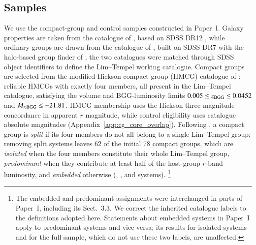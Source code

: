\documentclass{aa}
\begin{document}
\subsection{Samples}\label{sec:samples}
We use the compact-group and control samples constructed in Paper~I. Galaxy properties are taken from the catalogue of \citet{Tempel+17}, based on SDSS DR12 \citep{York+00,Alam+15}, while ordinary groups are drawn from the catalogue of \citet{Lim+17}, built on SDSS DR7 \citep{Abazajian+09} with the halo-based group finder of \citet{Yang+07}; the two catalogues were matched through SDSS object identifiers to define the Lim--Tempel working catalogue. Compact groups are selected from the modified Hickson compact-group (HMCG) catalogue of \citet{DiazGimenez+18}: reliable HMCGs with exactly four members, all present in the Lim--Tempel catalogue, satisfying the volume and BGG-luminosity limits $0.005 \le z_{\rm BGG} \le 0.0452$ and $M_{r,\rm BGG}\leq -21.81$. HMCG membership uses the Hickson three-magnitude concordance in apparent $r$ magnitude, while control eligibility uses catalogue absolute magnitudes (Appendix~\ref{app:cg_core_overlap}). Following \citet{Zheng&Shen21}, a compact group is \emph{split} if its four members do not all belong to a single Lim--Tempel group; removing split systems leaves 62 of the initial 78 compact groups, which are \emph{isolated} when the four members constitute their whole Lim--Tempel group, \emph{predominant} when they contribute at least half of the host-group $r$-band luminosity, and \emph{embedded} otherwise (\nGrIso, \nGrPre, and \nGrEmb{} systems).
\footnote{The embedded and predominant assignments were interchanged in parts of Paper~I, including its Sect.~3.3. We correct the inherited catalogue labels to the definitions adopted here. Statements about embedded systems in Paper~I apply to predominant systems and vice versa; its results for isolated systems and for the full sample, which do not use these two labels, are unaffected.}
\end{document}
